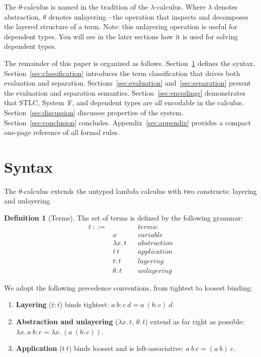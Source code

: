 \documentclass[11pt,letterpaper]{article}
\theoremstyle{definition}
\newtheorem{definition}{Definition}[section]
\begin{document}
The $\theta$-calculus is named in the tradition of the $\lambda$-calculus.
Where $\lambda$ denotes abstraction, $\theta$ denotes unlayering---the
operation that inspects and decomposes the layered structure of a term. Note: this unlayering operation is useful for dependent types. You will see in the later sections how it is used for solving dependent types.

The remainder of this paper is organized as follows.
Section~\ref{sec:syntax} defines the syntax.
Section~\ref{sec:classification} introduces the term classification that
drives both evaluation and separation.
Sections~\ref{sec:evaluation} and~\ref{sec:separation} present the evaluation
and separation semantics.
Section~\ref{sec:encodings} demonstrates that STLC, System~F,
and dependent types are all encodable in the calculus.
Section~\ref{sec:discussion} discusses properties of the system.
Section~\ref{sec:conclusion} concludes.
Appendix~\ref{sec:appendix} provides a compact one-page reference of all
formal rules.


\section{Syntax}\label{sec:syntax}

The $\theta$-calculus extends the untyped lambda calculus with two constructs:
layering and unlayering.

\begin{definition}[Terms]
The set of terms is defined by the following grammar:
$$
\begin{array}{rcll}
t \  ::= & & & \textit{terms:} \\[4pt]
  & x & & \textit{variable} \\
  & \lambda x.\, t & & \textit{abstraction} \\
  & t \ t & & \textit{application} \\
  & t {:} t & & \textit{layering} \\
  & \theta.\, t & & \textit{unlayering}
\end{array}
$$
\end{definition}

We adopt the following precedence conventions, from tightest to loosest
binding:

\begin{enumerate}
\item \textbf{Layering} ($t{:}t$) binds tightest:
  $a\ b{:}c\ d = a\ (b{:}c)\ d$.
\item \textbf{Abstraction and unlayering} ($\lambda x.\,t$, $\theta.\,t$)
  extend as far right as possible:
  $\lambda x.\,a\ b{:}c = \lambda x.\,(a\ (b{:}c))$.
\item \textbf{Application} ($t\ t$) binds loosest and is left-associative:
  $a\ b\ c = (a\ b)\ c$.
\end{enumerate}
\end{document}
